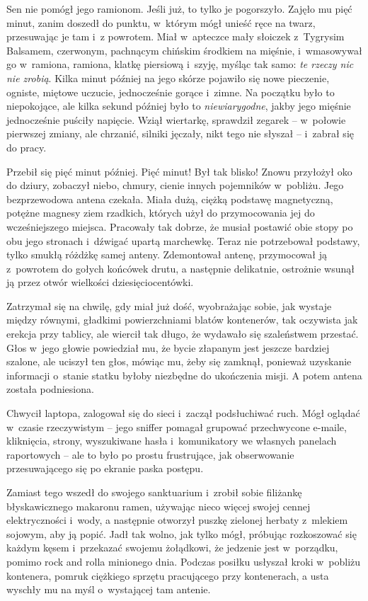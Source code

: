 \documentclass[oneside,polish,11pt,rmheadings]{mwbk}
\begin{document}
Sen nie pomógł jego ramionom. Jeśli już, to tylko je pogorszyło. Zajęło mu pięć minut, zanim doszedł do punktu, w~którym mógł unieść ręce na twarz, przesuwając je tam i~z powrotem. Miał w~apteczce mały słoiczek z~Tygrysim Balsamem, czerwonym, pachnącym chińskim środkiem na mięśnie, i~wmasowywał go w~ramiona, ramiona, klatkę piersiową i~szyję, myśląc tak samo: \textit{te rzeczy nic nie zrobią}. Kilka minut później na jego skórze pojawiło się nowe pieczenie, ogniste, miętowe uczucie, jednocześnie gorące i~zimne. Na początku było to niepokojące, ale kilka sekund później było to \textit{niewiarygodne}, jakby jego mięśnie jednocześnie puściły napięcie. Wziął wiertarkę, sprawdził zegarek -- w~połowie pierwszej zmiany, ale chrzanić, silniki jęczały, nikt tego nie słyszał -- i~zabrał się do pracy.

Przebił się pięć minut później. Pięć minut! Był tak blisko! Znowu przyłożył oko do dziury, zobaczył niebo, chmury, cienie innych pojemników w~pobliżu. Jego bezprzewodowa antena czekała. Miała dużą, ciężką podstawę magnetyczną, potężne magnesy ziem rzadkich, których użył do przymocowania jej do wcześniejszego miejsca. Pracowały tak dobrze, że musiał postawić obie stopy po obu jego stronach i~dźwigać upartą marchewkę. Teraz nie potrzebował podstawy, tylko smukłą różdżkę samej anteny. Zdemontował antenę, przymocował ją z~powrotem do gołych końcówek drutu, a następnie delikatnie, ostrożnie wsunął ją przez otwór wielkości dziesięciocentówki.

Zatrzymał się na chwilę, gdy miał już dość, wyobrażając sobie, jak wystaje między równymi, gładkimi powierzchniami blatów kontenerów, tak oczywista jak erekcja przy tablicy, ale wiercił tak długo, że wydawało się szaleństwem przestać. Głos w~jego głowie powiedział mu, że bycie złapanym jest jeszcze bardziej szalone, ale uciszył ten głos, mówiąc mu, żeby się zamknął, ponieważ uzyskanie informacji o~stanie statku byłoby niezbędne do ukończenia misji. A potem antena została podniesiona.

Chwycił laptopa, zalogował się do sieci i~zaczął podsłuchiwać ruch. Mógł oglądać w~czasie rzeczywistym -- jego sniffer pomagał grupować przechwycone e-maile, kliknięcia, strony, wyszukiwane hasła i~komunikatory we własnych panelach raportowych -- ale to było po prostu frustrujące, jak obserwowanie przesuwającego się po ekranie paska postępu.

Zamiast tego wszedł do swojego sanktuarium i~zrobił sobie filiżankę błyskawicznego makaronu ramen, używając nieco więcej swojej cennej elektryczności i~wody, a następnie otworzył puszkę zielonej herbaty z~mlekiem sojowym, aby ją popić. Jadł tak wolno, jak tylko mógł, próbując rozkoszować się każdym kęsem i~przekazać swojemu żołądkowi, że jedzenie jest w~porządku, pomimo rock and rolla minionego dnia. Podczas posiłku usłyszał kroki w~pobliżu kontenera, pomruk ciężkiego sprzętu pracującego przy kontenerach, a usta wyschły mu na myśl o~wystającej tam antenie.
\end{document}
